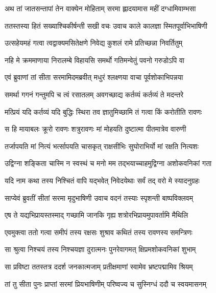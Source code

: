 
\twolineshloka
{अथ तां जातसन्तापां तेन वाक्येन मोहिताम्}
{सरमा ह्लादयामास महीं दग्धामिवाम्भसा} %

\twolineshloka
{ततस्तस्या हितं सख्याश्चिकीर्षन्ती सखी वचः}
{उवाच काले कालज्ञा स्मितपूर्वाभिभाषिणी} %

\twolineshloka
{उत्सहेयमहं गत्वा त्वद्वाक्यमसितेक्षणे}
{निवेद्य कुशलं रामे प्रतिच्छन्ना निवर्तितुम्} %

\twolineshloka
{नहि मे क्रममाणाया निरालम्बे विहायसि}
{समर्थो गतिमन्वेतुं पवनो गरुडोऽपि वा} %

\twolineshloka
{एवं ब्रुवाणां तां सीता सरमामिदमब्रवीत्}
{मधुरं श्लक्ष्णया वाचा पूर्वशोकाभिपन्नया} %

\twolineshloka
{समर्था गगनं गन्तुमपि च त्वं रसातलम्}
{अवगच्छाद्य कर्तव्यं कर्तव्यं ते मदन्तरे} %

\twolineshloka
{मत्प्रियं यदि कर्तव्यं यदि बुद्धिः स्थिरा तव}
{ज्ञातुमिच्छामि तं गत्वा किं करोतीति रावणः} %

\twolineshloka
{स हि मायाबलः क्रूरो रावणः शत्रुरावणः}
{मां मोहयति दुष्टात्मा पीतमात्रेव वारुणी} %

\twolineshloka
{तर्जापयति मां नित्यं भर्त्सापयति चासकृत्}
{राक्षसीभिः सुघोराभिर्यो मां रक्षति नित्यशः} %

\twolineshloka
{उद्विग्ना शङ्किता चास्मि न स्वस्थं च मनो मम}
{तद्भयाच्चाहमुद्विग्ना अशोकवनिकां गता} %

\twolineshloka
{यदि नाम कथा तस्य निश्चितं वापि यद्भवेत्}
{निवेदयेथाः सर्वं तद् वरो मे स्यादनुग्रहः} %

\twolineshloka
{साप्येवं ब्रुवतीं सीतां सरमा मृदुभाषिणी}
{उवाच वदनं तस्याः स्पृशन्ती बाष्पविक्लवम्} %

\twolineshloka
{एष ते यद्यभिप्रायस्तस्माद् गच्छामि जानकि}
{गृह्य शत्रोरभिप्रायमुपावर्तामि मैथिलि} %

\twolineshloka
{एवमुक्त्वा ततो गत्वा समीपं तस्य रक्षसः}
{शुश्राव कथितं तस्य रावणस्य समन्त्रिणः} %

\twolineshloka
{सा श्रुत्वा निश्चयं तस्य निश्चयज्ञा दुरात्मनः}
{पुनरेवागमत् क्षिप्रमशोकवनिकां शुभाम्} %

\twolineshloka
{सा प्रविष्टा ततस्तत्र ददर्श जनकात्मजाम्}
{प्रतीक्षमाणां स्वामेव भ्रष्टपद्मामिव श्रियम्} %

\twolineshloka
{तां तु सीता पुनः प्राप्तां सरमां प्रियभाषिणीम्}
{परिष्वज्य च सुस्निग्धं ददौ च स्वयमासनम्} %

